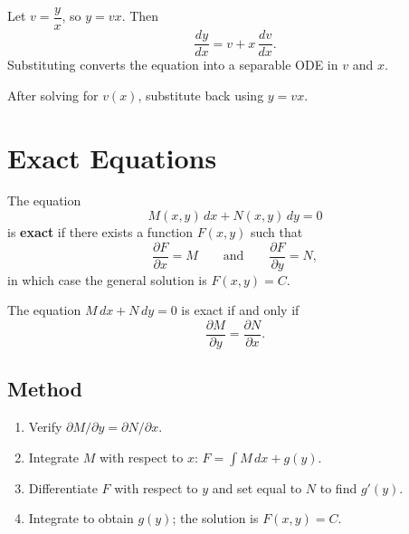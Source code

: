 Let $v = \dfrac{y}{x}$, so $y = vx$. Then
\[
  \frac{dy}{dx} = v + x\,\frac{dv}{dx}.
\]
Substituting converts the equation into a separable ODE in $v$ and $x$.

\begin{remark}
After solving for $v(x)$, substitute back using $y = vx$.
\end{remark}

\section{Exact Equations}

\begin{definition}
The equation
\[
  M(x,y)\,dx + N(x,y)\,dy = 0
\]
is \textbf{exact} if there exists a function $F(x,y)$ such that
\[
  \frac{\partial F}{\partial x} = M \qquad\text{and}\qquad \frac{\partial F}{\partial y} = N,
\]
in which case the general solution is $F(x,y) = C$.
\end{definition}

\begin{theorem}
The equation $M\,dx + N\,dy = 0$ is exact if and only if
\[
  \frac{\partial M}{\partial y} = \frac{\partial N}{\partial x}.
\]
\end{theorem}

\subsection{Method}

\begin{enumerate}
  \item Verify $\partial M/\partial y = \partial N/\partial x$.
  \item Integrate $M$ with respect to $x$: $F = \int M\,dx + g(y)$.
  \item Differentiate $F$ with respect to $y$ and set equal to $N$ to find $g'(y)$.
  \item Integrate to obtain $g(y)$; the solution is $F(x,y) = C$.
\end{enumerate}
